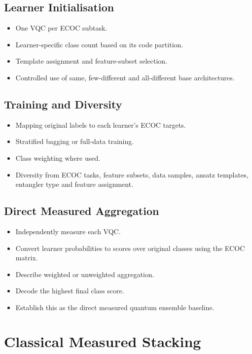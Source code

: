 \documentclass[]{UCD_CS_MSc_AAI_Report}
\begin{document}
\subsection{Learner Initialisation}
\begin{itemize}
    \item One VQC per ECOC subtask.
    \item Learner-specific class count based on its code partition.
    \item Template assignment and feature-subset selection.
    \item Controlled use of same, few-different and all-different base architectures.
\end{itemize}

\subsection{Training and Diversity}
\begin{itemize}
    \item Mapping original labels to each learner's ECOC targets.
    \item Stratified bagging or full-data training.
    \item Class weighting where used.
    \item Diversity from ECOC tasks, feature subsets, data samples, ansatz templates, entangler type and feature assignment.
\end{itemize}

\subsection{Direct Measured Aggregation}
\begin{itemize}
    \item Independently measure each VQC.
    \item Convert learner probabilities to scores over original classes using the ECOC matrix.
    \item Describe weighted or unweighted aggregation.
    \item Decode the highest final class score.
    \item Establish this as the direct measured quantum ensemble baseline.
\end{itemize}

\section{Classical Measured Stacking}
\label{sec:method-classical-stacking}
\end{document}

